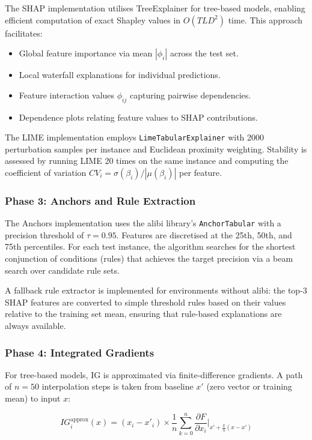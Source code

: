 \documentclass[journal]{IEEEtran}
\begin{document}
The SHAP implementation utilises TreeExplainer for tree-based models, enabling efficient computation of exact Shapley values in $O(TLD^2)$ time. This approach facilitates:
\begin{itemize}
\item Global feature importance via mean $|\phi_i|$ across the test set.
\item Local waterfall explanations for individual predictions.
\item Feature interaction values $\phi_{ij}$ capturing pairwise dependencies.
\item Dependence plots relating feature values to SHAP contributions.
\end{itemize}

The LIME implementation employs \texttt{LimeTabularExplainer} with 2000 perturbation samples per instance and Euclidean proximity weighting. Stability is assessed by running LIME 20 times on the same instance and computing the coefficient of variation $CV_i = \sigma(\beta_i)/|\mu(\beta_i)|$ per feature.

\subsubsection{Phase 3: Anchors and Rule Extraction}

The Anchors implementation uses the alibi library's \texttt{AnchorTabular} with a precision threshold of $\tau = 0.95$. Features are discretised at the 25th, 50th, and 75th percentiles. For each test instance, the algorithm searches for the shortest conjunction of conditions (rules) that achieves the target precision via a beam search over candidate rule sets.

A fallback rule extractor is implemented for environments without alibi: the top-3 SHAP features are converted to simple threshold rules based on their values relative to the training set mean, ensuring that rule-based explanations are always available.

\subsubsection{Phase 4: Integrated Gradients}

For tree-based models, IG is approximated via finite-difference gradients. A path of $n = 50$ interpolation steps is taken from baseline $x'$ (zero vector or training mean) to input $x$:

\begin{equation}
IG_i^{\text{approx}}(x) = (x_i - x'_i) \times \frac{1}{n}\sum_{k=0}^{n} \frac{\partial F}{\partial x_i}\bigg|_{x' + \frac{k}{n}(x-x')}
\end{equation}
\end{document}
